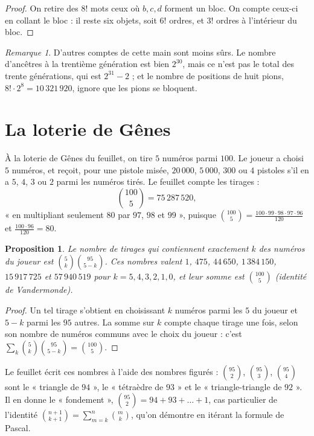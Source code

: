 \documentclass[11pt,a4paper]{article}
\theoremstyle{plain}
\newtheorem{proposition}[theoreme]{Proposition}
\theoremstyle{definition}
\theoremstyle{remark}
\newtheorem{remarque}[theoreme]{Remarque}
\begin{document}
\begin{proof}
On retire des $8!$ mots ceux où $b,c,d$ forment un bloc. On compte ceux-ci en collant le bloc : il reste six objets, soit $6!$ ordres, et $3!$ ordres à l'intérieur du bloc.
\end{proof}

\begin{remarque}
D'autres comptes de cette main sont moins sûrs. Le nombre d'ancêtres à la trentième génération est bien $2^{30}$, mais ce n'est pas le total des trente générations, qui est $2^{31}-2$ ; et le nombre de positions de huit pions, $8!\cdot2^8=10\,321\,920$, ignore que les pions se bloquent.
\end{remarque}

\section{La loterie de Gênes}\label{sec:loterie}

À la loterie de Gênes du feuillet, on tire $5$ numéros parmi $100$. Le joueur a choisi $5$ numéros, et reçoit, pour une pistole misée, $20\,000$, $5\,000$, $300$ ou $4$ pistoles s'il en a $5$, $4$, $3$ ou $2$ parmi les numéros tirés. Le feuillet compte les tirages :
\[
  \binom{100}5=75\,287\,520,
\]
« en multipliant seulement $80$ par $97$, $98$ et $99$ », puisque $\binom{100}5=\frac{100\cdot99\cdot98\cdot97\cdot96}{120}$ et $\frac{100\cdot96}{120}=80$.

\begin{proposition}\label{prop:hyper}
Le nombre de tirages qui contiennent exactement $k$ des numéros du joueur est $\binom5k\binom{95}{5-k}$. Ces nombres valent $1$, $475$, $44\,650$, $1\,384\,150$, $15\,917\,725$ et $57\,940\,519$ pour $k=5,4,3,2,1,0$, et leur somme est $\binom{100}5$ (identité de Vandermonde).
\end{proposition}

\begin{proof}
Un tel tirage s'obtient en choisissant $k$ numéros parmi les $5$ du joueur et $5-k$ parmi les $95$ autres. La somme sur $k$ compte chaque tirage une fois, selon son nombre de numéros communs avec le choix du joueur : c'est $\sum_k\binom5k\binom{95}{5-k}=\binom{100}5$.
\end{proof}

Le feuillet écrit ces nombres à l'aide des nombres figurés : $\binom{95}2$, $\binom{95}3$, $\binom{95}4$ sont le « triangle de $94$ », le « tétraèdre de $93$ » et le « triangle-triangle de $92$ ». Il en donne le « fondement », $\binom{95}2=94+93+\dots+1$, cas particulier de l'identité $\binom{n+1}{k+1}=\sum_{m=k}^n\binom mk$, qu'on démontre en itérant la formule de Pascal.
\end{document}
